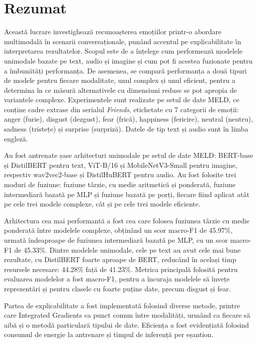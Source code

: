 \documentclass[12pt, a4paper]{article}
\begin{document}
\restoregeometry %
\newpage
{} %

\section*{Rezumat}
Această lucrare investighează recunoașterea emoțiilor printr-o abordare multimodală în scenarii conversaționale, punând accentul pe explicabilitate în interpretarea rezultatelor. Scopul este de a înțelege cum performează modelele unimodale bazate pe text, audio și imagine și cum pot fi acestea fuzionate pentru a îmbunătăți performanța. De asemenea, se compară performanța a două tipuri de modele pentru fiecare modalitate, unul complex și unul eficient, pentru a determina în ce măsură alternativele cu dimensiuni reduse se pot apropia de variantele complexe. Experimentele sunt realizate pe setul de date MELD, ce conține cadre extrase din serialul \textit{Friends}, etichetate cu 7 categorii de emoții: anger (furie), disgust (dezgust), fear (frică), happiness (fericire), neutral (neutru), sadness (tristețe) și surprise (surpriză). Datele de tip text și audio sunt în limba engleză.

Au fost antrenate șase arhitecturi unimodale pe setul de date MELD: BERT-base și DistilBERT pentru text, ViT-B/16 și MobileNetV3-Small pentru imagine, respectiv wav2vec2-base și DistilHuBERT pentru audio. Au fost folosite trei moduri de fuziune: fuziune târzie, cu medie aritmetică și ponderată, fuziune intermediară bazată pe MLP și fuziune bazată pe porți, fiecare fiind aplicat atât pe cele trei modele complexe, cât și pe cele trei modele eficiente.

Arhitectura cea mai performantă a fost cea care folosea fuziunea târzie cu medie ponderată între modelele complexe, obținând un scor macro-F1 de 45.97\%, urmată îndeaproape de fuziunea intermediară bazată pe MLP, cu un scor macro-F1 de 45.33\%. Dintre modelele unimodale, cele pe text au avut cele mai bune rezultate, cu DistilBERT foarte aproape de BERT, reducând în același timp resursele necesare: 44.28\% față de 41.23\%. Metrica principală folosită pentru evaluarea modelelor a fost macro-F1, pentru a încuraja modelele să învețe reprezentări și pentru clasele cu foarte puține date, precum disgust și fear.

Partea de explicabilitate a fost implementată folosind diverse metode, printre care Integrated Gradients ca punct comun între modalități, urmând ca fiecare să aibă și o metodă particulară tipului de date. Eficiența a fost evidențiată folosind consumul de energie la antrenare și timpul de inferență per eșantion.
\end{document}
